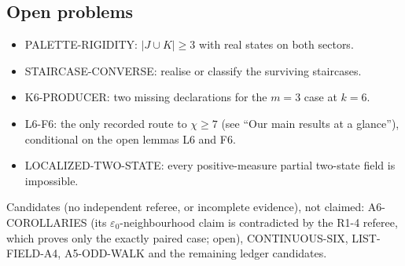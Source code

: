 \documentclass[11pt]{article}
\theoremstyle{definition}
\theoremstyle{remark}
\begin{document}
\subsection{Open problems}
\begin{itemize}
\item PALETTE-RIGIDITY: $|J\cup K|\ge3$ with real states on both sectors.
\item STAIRCASE-CONVERSE: realise or classify the surviving staircases.
\item K6-PRODUCER: two missing declarations for the $m=3$ case at $k=6$.
\item L6-F6: the only recorded route to $\chi\ge7$ (see ``Our main results at a glance''), conditional on the open
lemmas L6 and F6.
\item LOCALIZED-TWO-STATE: every positive-measure partial two-state field is
impossible.
\end{itemize}

Candidates (no independent referee, or incomplete evidence), not claimed: A6-COROLLARIES (its $\varepsilon_0$-neighbourhood claim is contradicted by the R1-4 referee, which proves only the exactly paired case; open),
CONTINUOUS-SIX, LIST-FIELD-A4, A5-ODD-WALK and the remaining
ledger candidates.
\end{document}
